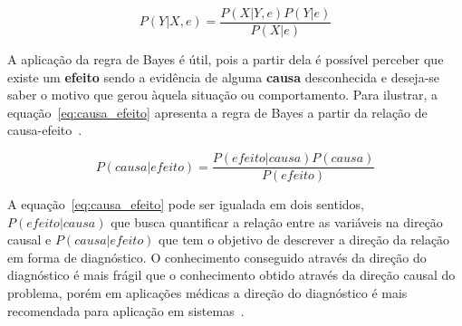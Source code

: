 \begin{equation}
    \label{eq:regra_bayes_evidencia}
    P(Y|X, e) = \frac{P(X|Y, e)P(Y|e)}{P(X|e)}
\end{equation}

A aplicação da regra de Bayes é útil, pois a partir dela é possível perceber que existe um \textbf{efeito} sendo a evidência de alguma \textbf{causa} desconhecida e deseja-se saber o motivo que gerou àquela situação ou comportamento. Para ilustrar, a equação~\ref{eq:causa_efeito} apresenta a regra de Bayes a partir da relação de causa-efeito~\cite{Russell:2002}.

\begin{equation}
    \label{eq:causa_efeito}
    P(causa|efeito) = \frac{P(efeito|causa)P(causa)}{P(efeito)}
\end{equation}

A equação~\ref{eq:causa_efeito} pode ser igualada em dois sentidos, $P(efeito|causa)$ que busca quantificar a relação entre as variáveis na direção causal e $P(causa|efeito)$ que tem o objetivo de descrever a direção da relação em forma de diagnóstico. O conhecimento conseguido através da direção do diagnóstico é mais frágil que o conhecimento obtido através da direção causal do problema, porém em aplicações médicas a direção do diagnóstico é mais recomendada para aplicação em sistemas~\cite{Russell:2002}.
